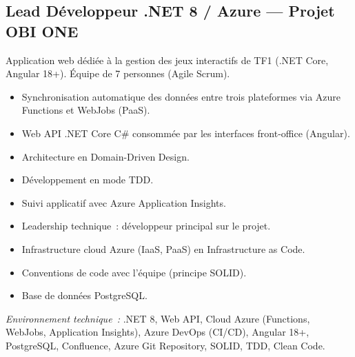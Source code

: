 \documentclass[10pt,a4paper]{article}
\begin{document}
\vspace{6pt}

\subsection*{Lead Développeur .NET 8 / Azure --- Projet OBI ONE}
\color{darkgray}
Application web dédiée à la gestion des jeux interactifs de TF1 (.NET Core, Angular 18+). Équipe de 7 personnes (Agile Scrum).
\begin{itemize}
  \item Synchronisation automatique des données entre trois plateformes via Azure Functions et WebJobs (PaaS).
  \item Web API .NET Core C\# consommée par les interfaces front-office (Angular).
  \item Architecture en Domain-Driven Design.
  \item Développement en mode TDD.
  \item Suivi applicatif avec Azure Application Insights.
  \item Leadership technique~: développeur principal sur le projet.
  \item Infrastructure cloud Azure (IaaS, PaaS) en Infrastructure as Code.
  \item Conventions de code avec l'équipe (principe SOLID).
  \item Base de données PostgreSQL.
\end{itemize}
\textit{Environnement technique~:} .NET 8, Web API, Cloud Azure (Functions, WebJobs, Application Insights), Azure DevOps (CI/CD), Angular 18+, PostgreSQL, Confluence, Azure Git Repository, SOLID, TDD, Clean Code.

\vspace{6pt}
\end{document}
